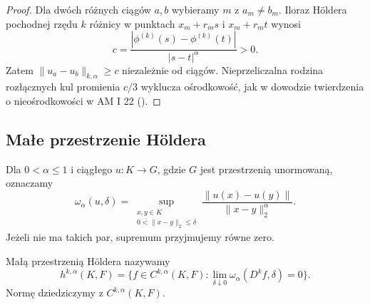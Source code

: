 \begin{proof}
Dla dwóch różnych ciągów $a,b$ wybieramy $m$
z $a_m\ne b_m$. Iloraz H\"oldera pochodnej
rzędu $k$ różnicy w punktach
$x_m+r_ms$ i $x_m+r_mt$ wynosi
\[
 c=\frac{|\phi^{(k)}(s)-\phi^{(k)}(t)|}
          {|s-t|^\alpha}>0.
\]
Zatem $\|u_a-u_b\|_{k,\alpha}\ge c$
niezależnie od ciągów. Nieprzeliczalna
rodzina rozłącznych kul promienia $c/3$
wyklucza ośrodkowość, jak w dowodzie
twierdzenia o nieośrodkowości w AM I 22
().
\end{proof}

\subsection{Małe przestrzenie H\"oldera}

Dla $0<\alpha\le1$ i ciągłego $u:K\to G$,
gdzie $G$ jest przestrzenią unormowaną,
oznaczamy
\[
 \omega_\alpha(u,\delta)=
 \sup_{\substack{x,y\in K\\0<\|x-y\|_2\le\delta}}
 \frac{\|u(x)-u(y)\|}{\|x-y\|_2^\alpha}.
\]
Jeżeli nie ma takich par, supremum przyjmujemy
równe zero.

\begin{definicja}
\label{ma2:def:little-holder}
Małą przestrzenią H\"oldera nazywamy
\[
 h^{k,\alpha}(K,F)=
 \{f\in C^{k,\alpha}(K,F):
    \lim_{\delta\downarrow0}
        \omega_\alpha(D^kf,\delta)=0\}.
\]
Normę dziedziczymy z $C^{k,\alpha}(K,F)$.
\end{definicja}

